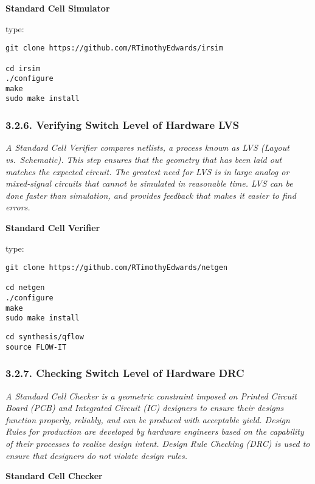 \documentclass[]{article}
\begin{document}
\textbf{Standard Cell Simulator}

type:

\begin{verbatim}
git clone https://github.com/RTimothyEdwards/irsim

cd irsim
./configure
make
sudo make install
\end{verbatim}

\subsubsection{3.2.6. Verifying Switch Level of Hardware
LVS}\label{verifying-switch-level-of-hardware-lvs}

\emph{A Standard Cell Verifier compares netlists, a process known as LVS
(Layout vs.~Schematic). This step ensures that the geometry that has
been laid out matches the expected circuit. The greatest need for LVS is
in large analog or mixed-signal circuits that cannot be simulated in
reasonable time. LVS can be done faster than simulation, and provides
feedback that makes it easier to find errors.}

\textbf{Standard Cell Verifier}

type:

\begin{verbatim}
git clone https://github.com/RTimothyEdwards/netgen

cd netgen
./configure
make
sudo make install
\end{verbatim}

\begin{verbatim}
cd synthesis/qflow
source FLOW-IT
\end{verbatim}

\subsubsection{3.2.7. Checking Switch Level of Hardware
DRC}\label{checking-switch-level-of-hardware-drc}

\emph{A Standard Cell Checker is a geometric constraint imposed on
Printed Circuit Board (PCB) and Integrated Circuit (IC) designers to
ensure their designs function properly, reliably, and can be produced
with acceptable yield. Design Rules for production are developed by
hardware engineers based on the capability of their processes to realize
design intent. Design Rule Checking (DRC) is used to ensure that
designers do not violate design rules.}

\textbf{Standard Cell Checker}
\end{document}
